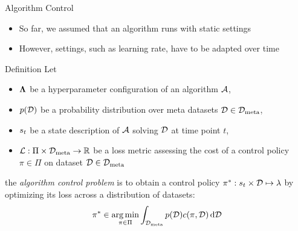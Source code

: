 \begin{frame}[c]{Algorithm Control~}

\begin{itemize}
	\item So far, we assumed that an algorithm runs with static settings
	\item However, settings, such as learning rate, have to be adapted over time
\end{itemize}

\begin{block}{Definition}
	Let 
	\begin{itemize}
		\item $\mathbf{\Lambda}$ be a hyperparameter configuration of an algorithm $\mathcal{A}$,
		\pause
		\item $p(\mathcal{D})$ be a probability distribution over meta datasets $\mathcal{D} \in \mathcal{D}_{\text{meta}}$,
		\pause
		\item $s_t$ be a state description of $\mathcal{A}$ solving $\mathcal{D}$ at time point $t$,
		\pause
		\item $\mathcal{L}: \Pi \times \mathcal{D}_{\text{meta}} \to \mathbb{R}$ be a loss metric assessing the cost of a control policy $\pi \in \Pi$ on dataset $\mathcal{D} \in \mathcal{D}_{\text{meta}}$
	\end{itemize}
	
	\pause
	the \emph{algorithm control problem} is to obtain a control policy $\pi^* : s_t \times \mathcal{D} \mapsto \mathbf{\lambda}$ by optimizing its loss across a distribution of datasets:
	\begin{equation}
	\pi^* \in \operatorname*{arg\,min}_{\pi \in \Pi} \int_{\mathcal{D}_{\text{meta}}} p(\mathcal{D}) c(\pi, \mathcal{D}) \mathop{}\!\mathrm{d} \mathcal{D} \nonumber
	\end{equation}
\end{block}

\end{frame}


